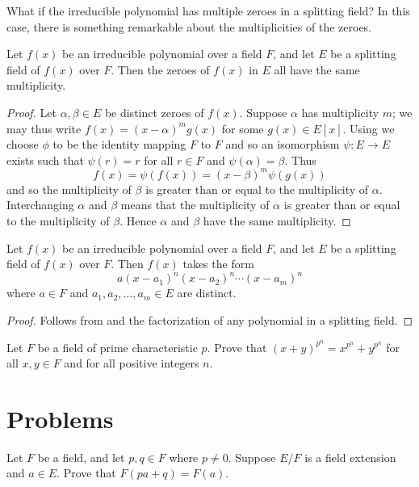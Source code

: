 What if the irreducible polynomial has multiple zeroes in a splitting field? In this case, there is something remarkable about the multiplicities of the zeroes.

\begin{theorem}\label{thrm-zeroes-of-irreducible-over-splitting-field-have-same-multiplicity}
    Let $f(x)$ be an irreducible polynomial over a field $F$, and let $E$ be a splitting field of $f(x)$ over $F$. Then the zeroes of $f(x)$ in $E$ all have the same multiplicity.
\end{theorem}
\begin{proof}
    Let $\alpha, \beta \in E$ be distinct zeroes of $f(x)$. Suppose $\alpha$ has multiplicity $m$; we may thus write $f(x) = (x-\alpha)^mg(x)$ for some $g(x) \in E[x]$. Using  we choose $\phi$ to be the identity mapping $F$ to $F$ and so an isomorphism $\psi: E \to E$ exists such that $\psi(r) = r$ for all $r \in F$ and $\psi(\alpha) = \beta$. Thus
    \[
        f(x) = \psi(f(x)) = (x-\beta)^m\psi(g(x))
    \]
    and so the multiplicity of $\beta$ is greater than or equal to the multiplicity of $\alpha$. Interchanging $\alpha$ and $\beta$ means that the multiplicity of $\alpha$ is greater than or equal to the multiplicity of $\beta$. Hence $\alpha$ and $\beta$ have the same multiplicity.
\end{proof}

\begin{corollary}\label{corollary-factorization-of-irreducible-polynomial-over-splitting-field}
    Let $f(x)$ be an irreducible polynomial over a field $F$, and let $E$ be a splitting field of $f(x)$ over $F$. Then $f(x)$ takes the form
    \[
        a(x-a_1)^n(x-a_2)^n\cdots(x-a_m)^n
    \]
    where $a \in F$ and $a_1, a_2, \dots, a_m \in E$ are distinct.
\end{corollary}
\begin{proof}
    Follows from  and the factorization of any polynomial in a splitting field.
\end{proof}

\begin{exercise}\label{exercise-freshman-dream}
    Let $F$ be a field of prime characteristic $p$. Prove that $(x + y)^{p^n} = x^{p^n} + y^{p^n}$ for all $x,y \in F$ and for all positive integers $n$.
\end{exercise}



\section{Problems}
\begin{problem}\label{problem-simple-extension-absorbs-field-elements}
    Let $F$ be a field, and let $p, q \in F$ where $p \neq 0$. Suppose $E/F$ is a field extension and $a \in E$. Prove that $F(pa + q) = F(a)$.
\end{problem}


